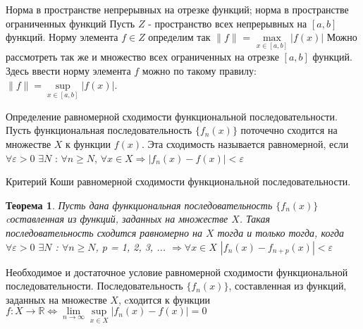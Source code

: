\documentclass[12pt, a4paper]{article}
\newtheorem{thm}{Теорема}
\newenvironment{field}{}{\newpage}
\newif\ifnote
\newenvironment{note}{\notetrue}{\notefalse}
\begin{document}
\begin{note}
\begin{field}
Норма в пространстве непрерывных на отрезке функций; норма в пространстве ограниченных функций
\end{field}
\begin{field}
Пусть $Z$ - пространство всех непрерывных на $[a, b]$ функций. Норму элемента $f \in Z$ определим так $\|f\|$ =
$\max\limits_{x \in [a, b]}|f(x)|$
\newline
Можно рассмотреть так же и множество всех ограниченных на отрезке $[a, b]$ функций. Здесь ввести норму элемента $f$ можно по такому правилу: $\|f\| = \sup\limits_{x \in[a, b]}|f(x)|$.


\end{field}
\end{note}

\begin{note}
\begin{field}
Определение равномерной сходимости функциональной последовательности.
\end{field}
\begin{field}
Пусть функциональная последовательность $\{f_n(x)\}$ поточечно сходится на множестве $X$ к функции $f(x)$. Эта сходимость называется равномерной, если $\forall \varepsilon > 0$ $\exists N$ : $\forall n \geq N$, $\forall x \in X \Longrightarrow |f_n(x) - f(x)| < \varepsilon$


\end{field}
\end{note}

\begin{note}
\begin{field}
Критерий Коши равномерной сходимости функциональной последовательности.
\end{field}
\begin{field}
\begin{thm}
	Пусть дана функциональная последовательность $\{f_n(x)\}$ cоставленная из функций, заданных на множестве $X$. Такая последовательность сходится равномерно на $X$ тогда и только тогда, когда $\forall \varepsilon > 0$ $\exists N$ : $\forall n \geq N$, p = 1, 2, 3, ... $\Longrightarrow \forall x \in X$ $|f_n(x) - f_{n + p}(x)| < \varepsilon$

\end{thm}


\end{field}
\end{note}

\begin{note}
\begin{field}
Необходимое и достаточное условие равномерной сходимости функциональной последовательности.
\end{field}
\begin{field}
Последовательность $\{f_n(x)\}$, составленная из функций, заданных на множестве $X$, cходится к функции $f:X \to \mathbb{R} \Longleftrightarrow \lim\limits_{n \to \infty}\sup\limits_{x \in X}|f_n(x) - f(x)| = 0$


\end{field}
\end{note}
\end{document}
